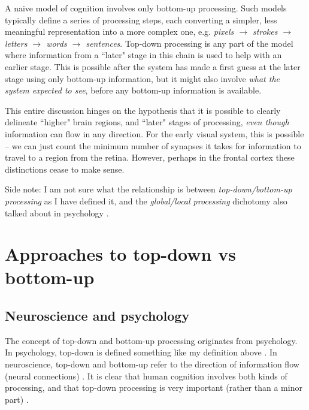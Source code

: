 \documentclass[10pt,a4paper]{article}
\begin{document}
A naive model of cognition involves only bottom-up processing. Such models typically define a series of processing steps, each converting a simpler, less meaningful representation into a more complex one, e.g. \emph{pixels $\rightarrow$ strokes $\rightarrow$ letters $\rightarrow$ words $\rightarrow$ sentences}. Top-down processing is any part of the model where information from a ``later" stage in this chain is used to help with an earlier stage. This is possible after the system has made a first guess at the later stage using only bottom-up information, but it might also involve \emph{what the system expected to see}, before any bottom-up information is available.

This entire discussion hinges on the hypothesis that it is possible to clearly delineate ``higher" brain regions, and ``later" stages of processing, \emph{even though} information can flow in any direction. For the early visual system, this is possible -- we can just count the minimum number of synapses it takes for information to travel to a region from the retina. However, perhaps in the frontal cortex these distinctions cease to make sense.

Side note: I am not sure what the relationship is between \emph{top-down/bottom-up processing} as I have defined it, and the \emph{global/local processing} dichotomy also talked about in psychology \cite{citationneeded}.

\section{Approaches to top-down vs bottom-up}
\subsection{Neuroscience and psychology}
The concept of top-down and bottom-up processing originates from psychology. In psychology, top-down is defined something like my definition above \cite{citationneeded}. In neuroscience, top-down and bottom-up refer to the direction of information flow (neural connections) \cite{citationneeded}. It is clear that human cognition involves both kinds of processing, and that top-down processing is very important (rather than a minor part) \cite{citationneeded}.
\end{document}
